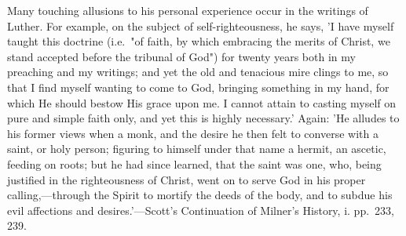 \documentclass[
]{book}
\begin{document}
{  Many touching allusions to his personal experience occur in the writings of Luther. For example, on the subject of self-righteousness, he says, 'I have myself taught this doctrine (i.e.~"of faith, by which embracing the merits of Christ, we stand accepted before the tribunal of God") for twenty years both in my preaching and my writings; and yet the old and tenacious mire clings to me, so that I find myself wanting to come to God, bringing something in my hand, for which He should bestow His grace upon me. I cannot attain to casting myself on pure and simple faith only, and yet this is highly necessary.' Again: 'He alludes to his former views when a monk, and the desire he then felt to converse with a saint, or holy person; figuring to himself under that name a hermit, an ascetic, feeding on roots; but he had since learned, that the saint was one, who, being justified in the righteousness of Christ, went on to serve God in his proper calling,---through the Spirit to mortify the deeds of the body, and to subdue his evil affections and desires.'---Scott's Continuation of Milner's History, i. pp.~233, 239.

}
\end{document}
